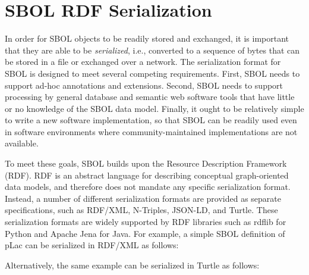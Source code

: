 \section{SBOL RDF Serialization}
\label{sec:serialization}

In order for SBOL objects to be readily stored and exchanged, it is important that they are able to be {\em serialized}, i.e., converted to a sequence of bytes that can be stored in a file or exchanged over a network.  The serialization format for SBOL is designed to meet several competing requirements. 
First, SBOL needs to support ad-hoc annotations and extensions. 
Second, SBOL needs to support processing by general database and semantic web software tools that have little or no knowledge of the SBOL data model. 
Finally, it ought to be relatively simple to write a new software implementation, so that SBOL can be readily used even in software environments where community-maintained implementations are not available.

To meet these goals, SBOL builds upon the Resource Description Framework (RDF).  RDF is an abstract language for describing conceptual graph-oriented data models, and therefore does not mandate any specific serialization format.  Instead, a number of different serialization formats are provided as separate specifications, such as RDF/XML, N-Triples, JSON-LD, and Turtle.  These serialization formats are widely supported by RDF libraries such as rdflib for Python and Apache Jena for Java.   For example, a simple SBOL definition of pLac can be serialized in RDF/XML as follows:

\vspace{3mm}

Alternatively, the same example can be serialized in Turtle as follows:

\vspace{3mm}

